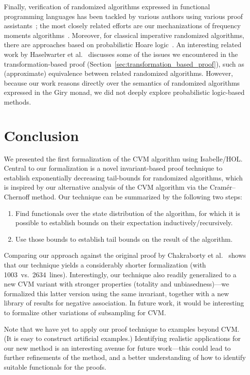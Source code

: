 \documentclass[a4paper,UKenglish,cleveref, autoref, thm-restate]{lipics-v2021}
\newcommand\locnew{1003}
\newcommand\locold{2634}
\begin{document}
Finally, verification of randomized algorithms expressed in functional programming languages has been tackled by various authors using various proof assistants~\cite{audebaud2009,bosshard2024,demedeiros2024, eberl2020,gopinathan20,haslbeck2016,hurd03,Probabilistic_Prime_Tests-AFP,tan2024,tassarotti2021}; the most closely related efforts are our mechanizations of frequency moments algorithms~\cite{karayel2022, karayel2023}.
Moreover, for classical imperative randomized algorithms, there are approaches based on probabilistic Hoare logic~\cite{denhartog2002}.
An interesting related work by Haselwarter et al.~\cite{haselwarter2025} discusses some of the issues we encountered in the transformation-based proof (Section~\ref{sec:transformation_based_proof}), such as (approximate) equivalence between related randomized algorithms.
However, because our work reasons directly over the semantics of randomized algorithms expressed in the Giry monad, we did not deeply explore probabilistic logic-based methods.

\section{Conclusion}\label{sec:conclusion}
We presented the first formalization of the CVM algorithm using Isabelle/HOL.
Central to our formalization is a novel invariant-based proof technique to establish exponentially decreasing tail-bounds for randomized algorithms, which is inspired by our alternative analysis of the CVM algorithm via the Cram\'{e}r--Chernoff method.
Our technique can be summarized by the following two steps:
\begin{enumerate}
\item Find functionals over the state distribution of the algorithm, for which it is possible to establish bounds on their expectation inductively/recursively.
\item Use those bounds to establish tail bounds on the result of the algorithm.
\end{enumerate}
Comparing our approach against the original proof by Chakraborty et al.~\cite{chakraborty2023} shows that our technique yields a considerably shorter formalization (with \locnew~vs.~\locold~lines).
Interestingly, our technique also readily generalized to a new CVM variant with stronger properties (totality and unbiasedness)---we formalized this latter version using the same invariant, together with a new library of results for negative association.
In future work, it would be interesting to formalize other variations of subsampling for CVM.

Note that we have yet to apply our proof technique to examples beyond CVM. (It is easy to construct artificial examples.)
Identifying realistic applications for our new method is an interesting avenue for future work---this could lead to further refinements of the method, and a better understanding of how to identify suitable functionals for the proofs.


\end{document}
